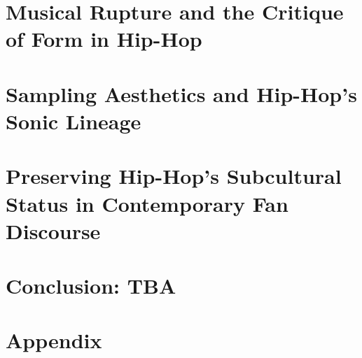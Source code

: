 \documentclass[12pt]{report}
\begin{document}
\chapter{Musical Rupture and the Critique of Form in Hip-Hop}


\chapter{Sampling Aesthetics and Hip-Hop's Sonic Lineage}


\chapter{Preserving Hip-Hop's Subcultural Status in Contemporary Fan Discourse}


\chapter{Conclusion: TBA}



\singlespacing
\printbibliography
{}
\nocite{*}

\chapter*{Appendix}

\end{document}
